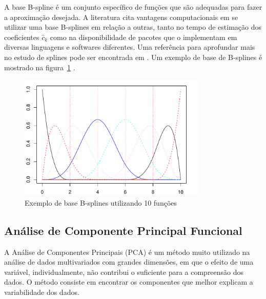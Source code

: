 \documentclass[
	12pt,				%
	openright,			%
	oneside,			%
	a4paper,			%
	english,			%
	brazil				%
	]{dissertacao-ufrgs-abntex2}
\begin{document}
A base B-spline é um conjunto específico de funções que são adequadas para fazer a aproximação desejada.
A literatura cita vantagens computacionais em se utilizar uma base B-splines em relação a outras, tanto no tempo de estimação dos coeficientes $\hat{c}_k$ como na disponibilidade de pacotes que o implementam em diversas linguagens e softwares diferentes.
Uma referência para aprofundar mais no estudo de splines pode ser encontrada em . Um exemplo de base de B-splines é mostrado na figura~\ref{fig-base-bspline} .
\begin{figure}[h!] \label{fig-base-bspline}
  \centering
    \includegraphics[width=0.8\textwidth]{anexos/base_bsplines1}
  \caption{Exemplo de base B-splines utilizando 10 funções}
\end{figure}

\subsection{Análise de Componente Principal Funcional}
\label{FPCA}

 A Análise de Componentes Principais (PCA) é um método muito utilizado na análise de dados multivariados com grandes dimensões, em que o efeito de uma variável, individualmente, não contribui o suficiente para a compreensão dos dados. O método consiste em encontrar os componentes que melhor explicam a variabilidade dos dados. 
\end{document}
